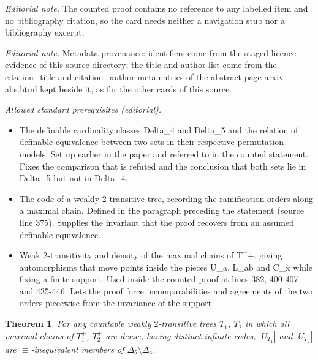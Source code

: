 \documentclass[10pt,a4paper]{amsart}
\newtheorem{theorem}{Theorem}[section]
\begin{document}
\noindent\textit{Editorial note.} The counted proof contains no reference to any labelled item and no bibliography citation, so the card needs neither a navigation stub nor a bibliography excerpt.\par\medskip
\noindent\textit{Editorial note.} Metadata provenance: identifiers come from the staged licence evidence of this source directory; the title and author list come from the citation\_title and citation\_author meta entries of the abstract page arxiv-abs.html kept beside it, as for the other cards of this source.\par\medskip
\noindent\textit{Allowed standard prerequisites (editorial).}\begin{itemize}
\item The definable cardinality classes Delta\_4 and Delta\_5 and the relation of definable equivalence between two sets in their respective permutation models. Set up earlier in the paper and referred to in the counted statement. Fixes the comparison that is refuted and the conclusion that both sets lie in Delta\_5 but not in Delta\_4.
\item The code of a weakly 2-transitive tree, recording the ramification orders along a maximal chain. Defined in the paragraph preceding the statement (source line 375). Supplies the invariant that the proof recovers from an assumed definable equivalence.
\item Weak 2-transitivity and density of the maximal chains of T\textasciicircum{}+, giving automorphisms that move points inside the pieces U\_a, L\_ab and C\_x while fixing a finite support. Used inside the counted proof at lines 382, 400-407 and 435-446. Lets the proof force incomparabilities and agreements of the two orders piecewise from the invariance of the support.
\end{itemize}\medskip
\begin{theorem}  \label{3.2} For any countable weakly $2$-transitive trees $T_1$, $T_2$ in which all maximal chains
of $T_1^+$, $T_2^+$ are dense, having distinct infinite codes, $|U_{T_1}|$ and $|U_{T_2}|$ are $\equiv$-inequivalent 
members of $\Delta_5 \setminus \Delta_4$.   \end{theorem}
\end{document}
